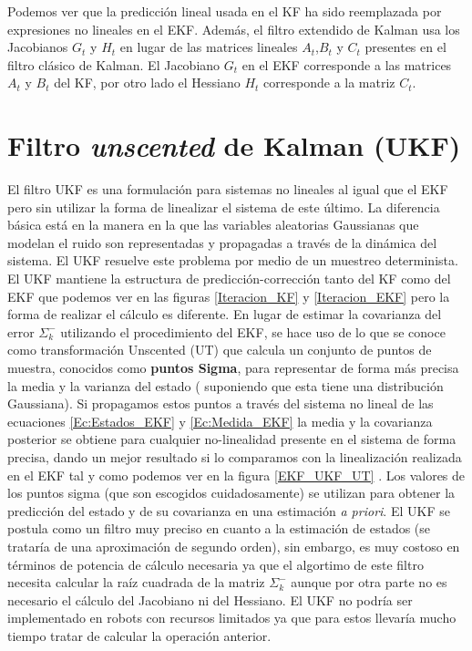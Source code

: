 Podemos ver que la predicción lineal usada en el \ac{KF} ha sido reemplazada por expresiones no lineales en el \ac{EKF}.
Además, el filtro extendido de Kalman usa los Jacobianos $G_{t}$ y $H_{t}$ en lugar de las matrices lineales $A_{t}$,$B_{t}$ y $C_{t}$ presentes en el filtro clásico de Kalman.
El Jacobiano $G_{t}$ en el \ac{EKF} corresponde a las matrices $A_{t}$ y $B_{t}$ del \ac{KF}, por otro lado el Hessiano $H_{t}$ corresponde a la matriz $C_{t}$.

\section{ Filtro \textit{unscented} de Kalman (UKF)}
El filtro \ac{UKF} es una formulación para sistemas no lineales \cite{julier_new_2000} al igual que el \ac{EKF} pero sin utilizar la forma de linealizar el sistema de este último.
La diferencia básica está en la manera en la que las variables aleatorias Gaussianas que modelan el ruido son representadas y propagadas a través de la dinámica del sistema.
El \ac{UKF} resuelve este problema por medio de un muestreo determinista.
El \ac{UKF} mantiene la estructura de predicción-corrección tanto del \ac{KF} como del \ac{EKF} que podemos ver en las figuras \ref{Iteracion_KF} y \ref{Iteracion_EKF} pero la forma de realizar el cálculo es diferente.
En lugar de estimar la covarianza del error $\Sigma_{k}^{-}$ utilizando el procedimiento del \ac{EKF}, se hace uso de lo que se conoce como transformación Unscented (UT) \cite{julier_new_2000} que calcula un conjunto de puntos de muestra, conocidos como \textbf{puntos Sigma}, para representar de forma más precisa la media y la varianza del estado ( suponiendo que esta tiene una distribución Gaussiana).
Si propagamos estos puntos a través del sistema no lineal de las ecuaciones \ref{Ec:Estados_EKF} y \ref{Ec:Medida_EKF} la media y la covarianza posterior se obtiene para cualquier no-linealidad presente en el sistema de forma precisa, dando un mejor resultado si lo comparamos con la linealización realizada en el \ac{EKF} tal y como podemos ver en la figura \ref{EKF_UKF_UT}   \cite{julier_general_1996} \cite{julier_new_1995} \cite{julier_unscented_2004}.
Los valores de los puntos sigma (que son escogidos cuidadosamente) se utilizan para obtener la predicción del estado y de su covarianza en una estimación \textit{a priori}.
El \ac{UKF} se postula como un filtro muy preciso en cuanto a la estimación de estados (se trataría de una aproximación de segundo orden), sin embargo, es muy costoso en términos de potencia de cálculo necesaria ya que el algortimo de este filtro necesita calcular la raíz cuadrada de la matriz $\Sigma_{k}^{-}$ aunque por otra parte no es necesario el cálculo del Jacobiano ni del Hessiano.
El \ac{UKF} no podría ser implementado en robots con recursos limitados ya que para estos llevaría mucho tiempo tratar de calcular la operación anterior.

